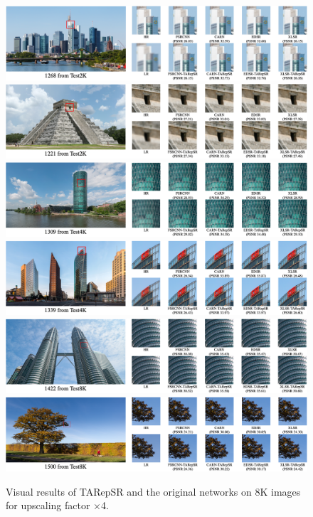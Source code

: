 \documentclass[sn-mathphys]{sn-jnl}%
\theoremstyle{thmstyleone}%
\theoremstyle{thmstyletwo}%
\theoremstyle{thmstylethree}%
\begin{document}
\begin{figure}
	\centering
	\includegraphics[width=4.6in]{1268.png}
	\\
	\centering
	\includegraphics[width=4.6in]{1221.png}
	\\
	\centering
	\includegraphics[width=4.6in]{1309.png}
	\\
	\centering
	\includegraphics[width=4.6in]{1339.png}
    \\
    \centering
	\includegraphics[width=4.6in]{1422.png}
	\\
	\centering
	\includegraphics[width=4.6in]{1500.png}
	\caption{Visual results of TARepSR and the original networks on 8K images for upscaling factor $\times$4.}
\label{resultImage}
\end{figure}
\end{document}
